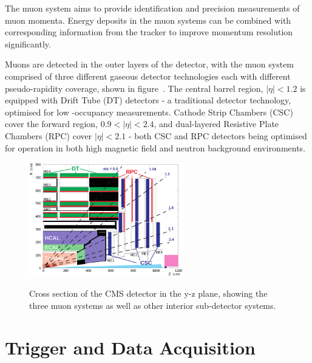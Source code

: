 
The muon system aims to provide identification and precision measurements of
muon momenta. Energy deposits in the muon systems can be combined with 
corresponding information from the tracker to improve momentum resolution
significantly.

Muons are detected in the outer layers of the detector, with the muon system 
comprised of three different gaseous detector technologies each with different 
pseudo-rapidity coverage, shown in figure~. The central barrel region, $|\eta|<1.2$ is equipped with 
Drift Tube (DT) detectors - a traditional detector technology, optimised for low
-occupancy measurements. Cathode Strip Chambers (CSC) cover the forward region,
$0.9 < |\eta| < 2.4$, and dual-layered Resistive Plate Chambers (RPC) cover
$|\eta| < 2.1$ - both CSC and RPC detectors being optimised for operation in 
both high magnetic field and neutron background environments.

\begin{figure}[ht!]
\centering
\includegraphics[width=0.6\textwidth]{Figs/machine/pictures_MuonSys-mod3.png}
\label{fig:muon_system_diagram}
\caption{Cross section of the CMS detector in the y-z plane, showing the three 
muon systems as well as other interior sub-detector systems.}
\end{figure}

\section{Trigger and Data Acquisition}  %
\label{sec:detector_trigger}

